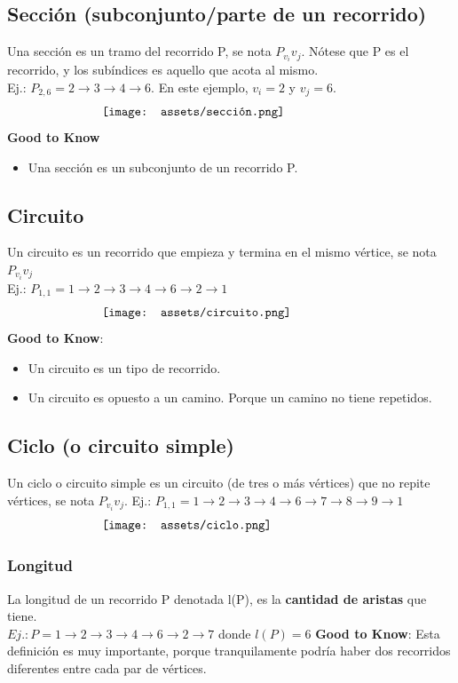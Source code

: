 \documentclass[10pt,a4paper]{article}
\begin{document}
\subsection*{Sección (subconjunto/parte de un recorrido)}
Una sección es un tramo del recorrido P, se nota $P_{v_{i}}{v_{j}}$. Nótese que P es el recorrido, y los subíndices es aquello que acota al mismo. \\
Ej.: $P_{2,6} = 2 \rightarrow 3 \rightarrow 4 \rightarrow 6$. En este ejemplo, $v_{i} = 2$ y $v_{j} = 6$.
\[\begin{minipage}[b]{0.6\textwidth}
    \texttt{[image: assets/sección.png]}
\end{minipage}\]
\textbf{Good to Know}
\begin{itemize}
    \item Una sección es un subconjunto de un recorrido P.
\end{itemize}
\subsection*{Circuito}
Un circuito es un recorrido que empieza y termina en el mismo vértice, se nota $P_{v_{i}}{v_{j}}$ \\
Ej.: $P_{1,1} = 1 \rightarrow 2 \rightarrow 3 \rightarrow 4 \rightarrow 6 \rightarrow 2 \rightarrow 1$
\[\begin{minipage}[b]{0.6\textwidth}
    \texttt{[image: assets/circuito.png]}
\end{minipage}\]
\textbf{Good to Know}:
\begin{itemize}
    \item Un circuito es un tipo de recorrido. 
    \item Un circuito es opuesto a un camino. Porque un camino no tiene repetidos.
\end{itemize}
\subsection*{Ciclo (o circuito simple)}
Un ciclo o circuito simple es un circuito (de tres o más vértices) que no repite vértices, se nota $P_{v_{i}}{v_{j}}$.
Ej.: $P_{1,1} = 1 \rightarrow 2 \rightarrow 3 \rightarrow 4 \rightarrow 6 \rightarrow 7 \rightarrow 8 \rightarrow 9 \rightarrow 1$
\[\begin{minipage}[b]{0.6\textwidth}
    \texttt{[image: assets/ciclo.png]}
\end{minipage}\]
\subsubsection*{Longitud}
La longitud de un recorrido P denotada l(P), es la \textbf{cantidad de aristas} que tiene. \\
$Ej.: P = 1 \rightarrow 2 \rightarrow 3 \rightarrow 4 \rightarrow 6 \rightarrow 2 \rightarrow 7$ donde $l(P) = 6$
\textbf{Good to Know}: Esta definición es muy importante, porque tranquilamente podría haber dos recorridos diferentes entre cada par de vértices.
\end{document}
